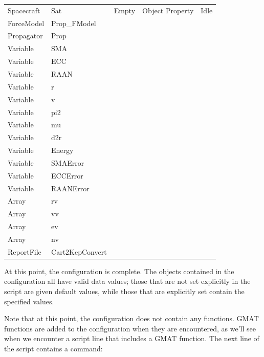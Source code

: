 \begin{center}
\tablelasttail{\hline}
\begin{supertabular}{|l l|l|l|l|}
Spacecraft & Sat & Empty & Object Property & Idle\\
ForceModel & Prop\_FModel & & & \\
Propagator & Prop & & & \\
Variable & SMA & & & \\
Variable & ECC & & & \\
Variable & RAAN & & & \\
Variable & r & & & \\
Variable & v & & & \\
Variable & pi2 & & & \\
Variable & mu & & & \\
Variable & d2r & & & \\
Variable & Energy & & & \\
Variable & SMAError & & & \\
Variable & ECCError & & & \\
Variable & RAANError & & & \\
Array & rv & & & \\
Array & vv & & & \\
Array & ev & & & \\
Array & nv & & & \\
ReportFile & Cart2KepConvert & & & \\
\end{supertabular}
\end{center}

\noindent At this point, the configuration is complete.  The objects contained in the configuration
all have valid data values; those that are not set explicitly in the script are given default
values, while those that are explicitly set contain the specified values.

Note that at this point, the configuration does not contain any functions.  GMAT functions are added
to the configuration when they are encountered, as we'll see when we encounter a script line that
includes a GMAT function.  The next line of the script contains a command:

